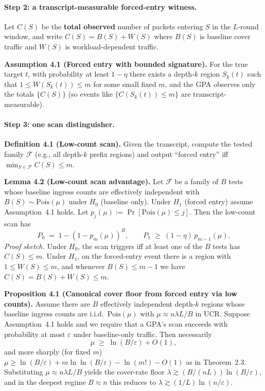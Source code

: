 \documentclass[
 11pt,
]{article}
\begin{document}
\paragraph{Step 2: a transcript-measurable forced-entry witness.}
Let $C(S)$ be the \textbf{total observed} number of packets entering $S$ in the
$L$-round window, and write
$C(S)=B(S)+W(S)$ where $B(S)$ is baseline cover traffic and $W(S)$ is
workload-dependent traffic.

\textbf{Assumption 4.1 (Forced entry with bounded signature).}
For the true target $t$, with probability at least $1-\eta$ there exists a
depth-$k$ region $S_k(t)$ such that $1\le W(S_k(t))\le m$ for some small fixed
$m$, and the GPA observes only the totals $\{C(S)\}$ (so events like
$\{C(S_k(t))\le m\}$ are transcript-measurable).

\paragraph{Step 3: one scan distinguisher.}
\textbf{Definition 4.1 (Low-count scan).}
Given the transcript, compute the tested family $\mathcal{F}$ (e.g., all
depth-$k$ prefix regions) and output ``forced entry'' iff
$\min_{S\in\mathcal{F}} C(S)\le m$.

\textbf{Lemma 4.2 (Low-count scan advantage).}
Let $\mathcal{F}$ be a family of $B$ tests whose baseline ingress counts are
effectively independent with $B(S)\sim \mathrm{Pois}(\mu)$ under $H_0$
(baseline only). Under $H_1$ (forced entry) assume Assumption~4.1 holds.
Let $p_j(\mu):=\Pr[\mathrm{Pois}(\mu)\le j]$. Then the low-count scan has
\[
P_0 \;=\; 1-(1-p_m(\mu))^B,\qquad
P_1 \;\ge\; (1-\eta)\,p_{m-1}(\mu).
\]
\emph{Proof sketch.} Under $H_0$, the scan triggers iff at least one of the $B$
tests has $C(S)\le m$. Under $H_1$, on the forced-entry event there is a region
with $1\le W(S)\le m$, and whenever $B(S)\le m-1$ we have $C(S)=B(S)+W(S)\le m$.

\textbf{Proposition 4.1 (Canonical cover floor from forced entry via low counts).}
Assume there are $B$ effectively independent depth-$k$ regions whose baseline
ingress counts are i.i.d.\ $\mathrm{Pois}(\mu)$ with $\mu \approx n\lambda L/B$ in
UCR. Suppose Assumption~4.1 holds and we require that a GPA's scan succeeds with
probability at most $\varepsilon$ under baseline-only traffic. Then necessarily
\[
\mu \;\ge\; \ln(B/\varepsilon)+O(1),
\]
and more sharply (for fixed $m$) $\mu \ge \ln(B/\varepsilon)+ m\ln\ln(B/\varepsilon)
-\ln(m!)-O(1)$ as in Theorem~2.3. Substituting $\mu\approx n\lambda L/B$ yields
the cover-rate floor $\lambda \gtrsim (B/(nL))\ln(B/\varepsilon)$, and in the
deepest regime $B\approx n$ this reduces to $\lambda \gtrsim (1/L)\ln(n/\varepsilon)$.
\end{document}
